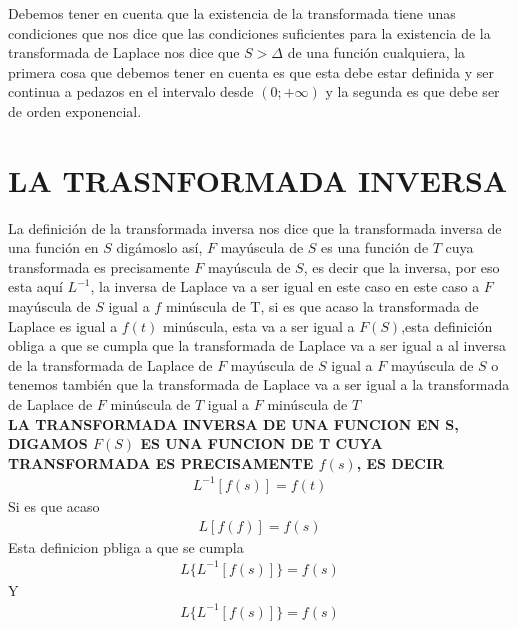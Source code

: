 \documentclass[11pt,letterpaper]{article}
\begin{document}
Debemos tener en cuenta que la existencia de la transformada tiene unas condiciones que nos
dice que las condiciones suficientes para la existencia de la transformada de Laplace nos dice que $S > \Delta$ de una función cualquiera, la primera cosa que debemos tener en
cuenta es que esta debe estar definida y ser continua a pedazos en el intervalo desde $(0; +\infty)$ y la segunda es que debe ser de orden exponencial.\\
\section{LA TRASNFORMADA INVERSA}
La definición de la transformada inversa nos dice que la transformada inversa de una función en $S$
digámoslo así, $F$ mayúscula de $S$ es una función de $T$ cuya transformada es precisamente $F$ mayúscula de $S$, es decir que la inversa, por eso esta aquí $L^{-1}$, la inversa de Laplace
va a ser igual en este caso en este caso a $F$ mayúscula de $S$ igual a $f$ minúscula de T, si es que acaso la transformada de Laplace es igual a $f(t)$ minúscula, esta va a ser igual a $F (S)$,esta definición obliga a que se cumpla que la transformada de Laplace va a ser igual a al inversa de la transformada de Laplace de $F$ mayúscula de $S$ igual a $F$ mayúscula de $S$ o tenemos también que la transformada de Laplace va a ser igual a la transformada de Laplace de $F$ minúscula de $T$ igual a
$F$ minúscula de $T$\\
\textbf{LA TRANSFORMADA INVERSA DE UNA FUNCION EN S, DIGAMOS $F(S)$ ES UNA FUNCION DE T CUYA
TRANSFORMADA ES PRECISAMENTE $f(s)$, ES DECIR}
\begin{align}
L^{-1} [f(s)]= f(t)
\end{align}
Si es que acaso
\begin{align}
L [f(f)] = f(s)
\end{align}
Esta definicion pbliga a que se cumpla
\begin{align}
L \lbrace L^{-1} [f(s)] \rbrace = f(s)
\end{align}
Y
\begin{align}
L \lbrace L^{-1} [f(s)] \rbrace = f(s)
\end{align}
\newpage
\end{document}
